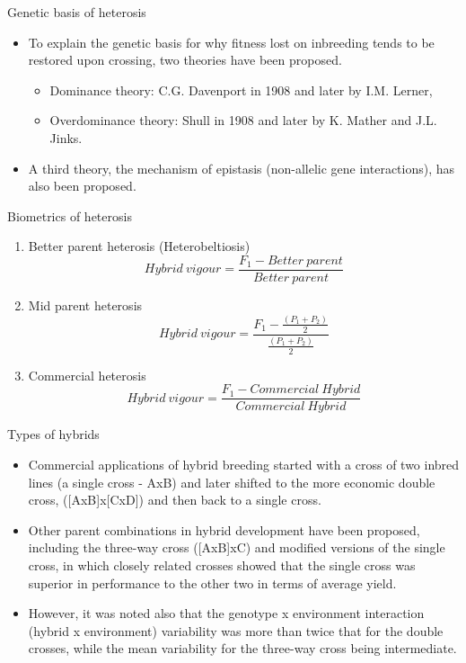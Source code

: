 \documentclass[11pt,dvipsnames,ignorenonframetext,aspectratio=169]{beamer}
\providecommand{\tightlist}{%
  \setlength{\itemsep}{0pt}\setlength{\parskip}{0pt}}
\begin{document}
\begin{frame}{Genetic basis of heterosis}
\protect\hypertarget{genetic-basis-of-heterosis}{}

\begin{itemize}
\tightlist
\item
  To explain the genetic basis for why fitness lost on inbreeding tends
  to be restored upon crossing, two theories have been proposed.

  \begin{itemize}
  \tightlist
  \item
    Dominance theory: C.G. Davenport in 1908 and later by I.M. Lerner,
  \item
    Overdominance theory: Shull in 1908 and later by K. Mather and J.L.
    Jinks.
  \end{itemize}
\item
  A third theory, the mechanism of epistasis (non-allelic gene
  interactions), has also been proposed.
\end{itemize}

\end{frame}

\begin{frame}{Biometrics of heterosis}
\protect\hypertarget{biometrics-of-heterosis}{}

\begin{enumerate}
\tightlist
\item
  Better parent heterosis (Heterobeltiosis)
  \[Hybrid~vigour = \frac{F_1-Better~parent}{Better~parent}\]
\item
  Mid parent heterosis
  \[Hybrid~vigour = \frac{F_1-\frac{(P_1+P_2)}{2}}{\frac{(P_1+P_2)}{2}}\]
\item
  Commercial heterosis
  \[Hybrid~vigour = \frac{F_1-Commercial~Hybrid}{Commercial~Hybrid}\]
\end{enumerate}

\end{frame}

\begin{frame}{Types of hybrids}
\protect\hypertarget{types-of-hybrids}{}

\begin{itemize}
\tightlist
\item
  Commercial applications of hybrid breeding started with a cross of two
  inbred lines (a single cross - AxB) and later shifted to the more
  economic double cross, ({[}AxB{]}x{[}CxD{]}) and then back to a single
  cross.
\item
  Other parent combinations in hybrid development have been proposed,
  including the three-way cross ({[}AxB{]}xC) and modified versions of
  the single cross, in which closely related crosses showed that the
  single cross was superior in performance to the other two in terms of
  average yield.
\item
  However, it was noted also that the genotype x environment interaction
  (hybrid x environment) variability was more than twice that for the
  double crosses, while the mean variability for the three-way cross
  being intermediate.
\end{itemize}

\end{frame}
\end{document}
